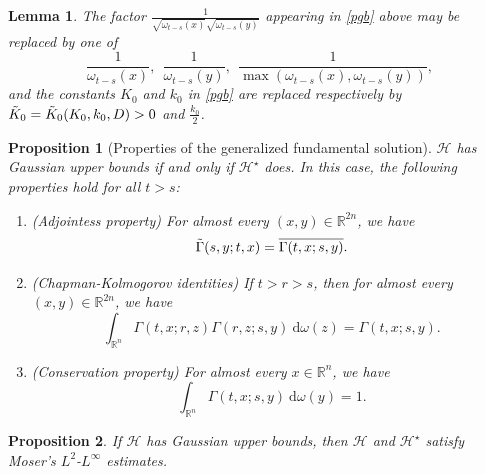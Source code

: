 \documentclass[10pt,a4paper]{amsart}
\newtheorem{prop}{Proposition}
\newtheorem{lem}{Lemma}
\begin{document}
\begin{lem}\label{lem:Cruz-Uribe et Rios}
    The factor $\frac{1}{\sqrt{\omega_{t-s}(x)}\sqrt{\omega_{t-s}(y)}}$ appearing in \eqref{pgb} above may be replaced by one of 
    \begin{equation*}
        \frac{1}{\omega_{t-s}(x) }, \ \ \frac{1}{\omega_{t-s}(y) }, \ \ \frac{1}{\max(\omega_{t-s}(x) ,\omega_{t-s}(y))},
    \end{equation*}
    and the constants $K_0$ and $k_0$ in \eqref{pgb} are replaced respectively by $\Tilde{K}_0=\Tilde{K}_0(K_0,k_0,D)>0$ and $\frac{k_0}{2}$.
\end{lem}

\begin{prop}[Properties of the generalized fundamental solution]\label{prop:solfundgeneralisée}
    $\mathcal{H}$ has Gaussian upper bounds if and only if $\mathcal{H}^\star$ does. In this case, the following properties hold for all $t>s$:
    \begin{enumerate}
        \item (Adjointess property) For almost every $(x,y) \in \mathbb{R}^{2n}$, we have
$$ \Tilde{\Gamma}(s,y;t,x) = \overline{\Gamma(t,x;s,y)}. $$
        \item (Chapman-Kolmogorov identities) If $t>r>s$, then for almost every $(x,y)\in \mathbb{R}^{2n}$, we have
        $$ \int_{\mathbb{R}^n} \Gamma(t,x;r,z) \Gamma(r,z;s,y) \ \mathrm{d}\omega(z)= \Gamma(t,x;s,y). $$
        \item (Conservation property) For almost every $x\in \mathbb{R}^n$, we have $$ \int_{\mathbb{R}^n} \Gamma(t,x;s,y) \ \mathrm{d}\omega(y)=1. $$
    \end{enumerate}
\end{prop}

\begin{prop}\label{ThmConverseHK}
    If $\mathcal{H}$ has Gaussian upper bounds, then $\mathcal{H}$ and $\mathcal{H}^\star$ satisfy Moser’s $L^2$-$L^\infty$ estimates.
\end{prop}
\end{document}
